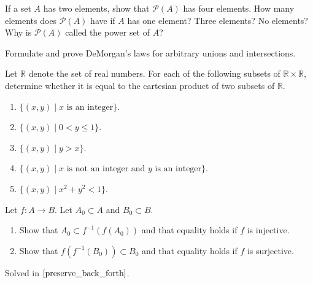   \begin{exercise}[Munkres 1.8]
    If a set $A$ has two elements, show that $\mathcal{P}(A)$ has four elements. How many elements does $\mathcal{P}(A)$ have if $A$ has one element? Three elements? No elements? Why is $\mathcal{P}(A)$ called the power set of $A$?
  \end{exercise}
  \begin{solution}
    
  \end{solution}

  \begin{exercise}[Munkres 1.9]
    Formulate and prove DeMorgan's laws for arbitrary unions and intersections.
  \end{exercise}
  \begin{solution}
    
  \end{solution}

  \begin{exercise}[Munkres 1.10]
    Let $\mathbb{R}$ denote the set of real numbers. For each of the following subsets of $\mathbb{R} \times \mathbb{R}$, determine whether it is equal to the cartesian product of two subsets of $\mathbb{R}$.
    \begin{enumerate}
      \item $\{(x, y) \mid x \text{ is an integer}\}$.
      \item $\{(x, y) \mid 0 < y \leq 1\}$.
      \item $\{(x, y) \mid y > x\}$.
      \item $\{(x, y) \mid x \text{ is not an integer and } y \text{ is an integer}\}$.
      \item $\{(x, y) \mid x^2 + y^2 < 1\}$.
    \end{enumerate}
  \end{exercise}
  \begin{solution}
    
  \end{solution}

  \begin{exercise}[Munkres 2.1]
    Let $f: A \to B$. Let $A_0 \subset A$ and $B_0 \subset B$.
    \begin{enumerate}
      \item Show that $A_0 \subset f^{-1}(f(A_0))$ and that equality holds if $f$ is injective.
      \item Show that $f(f^{-1}(B_0)) \subset B_0$ and that equality holds if $f$ is surjective.
    \end{enumerate}
  \end{exercise}
  \begin{solution}
    Solved in $\ref{preserve_back_forth}$. 
  \end{solution}

